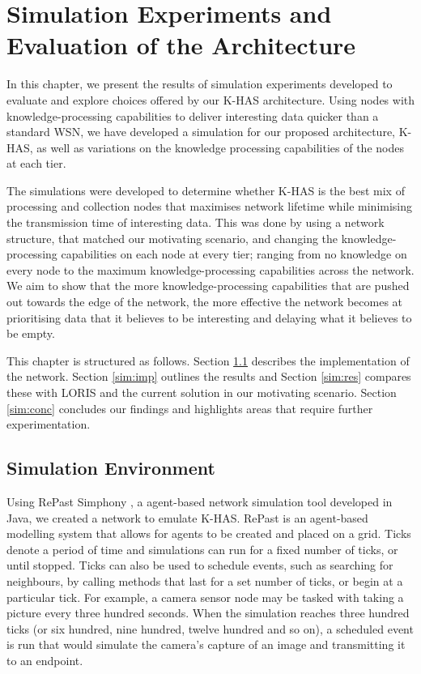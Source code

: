 \chapter{Simulation Experiments and Evaluation of the Architecture}
In this chapter, we present the results of simulation experiments developed to evaluate and explore choices offered by our K-HAS architecture. Using nodes with knowledge-processing capabilities to deliver interesting data quicker than a standard WSN, we have developed a simulation for our proposed architecture, K-HAS, as well as variations on the knowledge processing capabilities of the nodes at each tier.

The simulations were developed to determine whether K-HAS is the best mix of processing and collection nodes that maximises network lifetime while minimising the transmission time of interesting data. This was done by using a network structure, that matched our motivating scenario, and changing the knowledge-processing capabilities on each node at every tier; ranging from no knowledge on every node to the maximum knowledge-processing capabilities across the network. We aim to show that the more knowledge-processing capabilities that are pushed out towards the edge of the network, the more effective the network becomes at prioritising data that it believes to be interesting and delaying what it believes to be empty.

This chapter is structured as follows. Section \ref{sim:sim} describes the implementation of the network. Section \ref{sim:imp} outlines the results and Section \ref{sim:res} compares these with LORIS and the current solution in our motivating scenario. Section \ref{sim:conc} concludes our findings and highlights areas that require further experimentation.

\section{Simulation Environment}\label{sim:sim}

Using RePast Simphony \cite{Collier2003}, a agent-based network simulation tool developed in Java, we created a network to emulate K-HAS. RePast is an agent-based modelling system that allows for agents to be created and placed on a grid. Ticks denote a period of time and simulations can run for a fixed number of ticks, or until stopped. Ticks can also be used to schedule events, such as searching for neighbours, by calling methods that last for a set number of ticks, or begin at a particular tick. For example, a camera sensor node may be tasked with taking a picture every three hundred seconds. When the simulation reaches three hundred ticks (or six hundred, nine hundred, twelve hundred and so on), a scheduled event is run that would simulate the camera's capture of an image and transmitting it to an endpoint.

